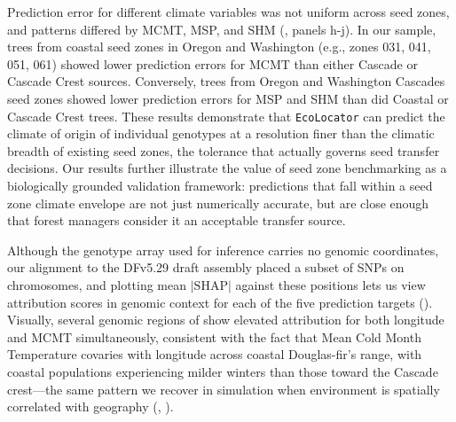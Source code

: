 \documentclass[]{article}
\newcommand{\dfir}{Douglas-fir\xspace}
\newcommand{\ecolocator}{\texttt{EcoLocator}\xspace}
\begin{document}
Prediction error for different climate variables was not uniform across seed zones,
and patterns differed by MCMT, MSP, and SHM
(, panels h-j). In our sample, trees from coastal seed 
zones in Oregon and Washington (e.g., zones 031, 041, 051, 061) showed lower prediction
errors for MCMT than either Cascade or Cascade Crest sources.
Conversely, trees from Oregon and Washington Cascades seed zones showed
lower prediction errors for MSP and SHM than did Coastal or Cascade Crest trees. 
These results demonstrate that \ecolocator
can predict the climate of origin of individual genotypes
at a resolution finer than the climatic breadth of existing seed zones,
the tolerance that actually governs seed transfer decisions.
Our results further illustrate the value of seed zone benchmarking
as a biologically grounded validation framework:
predictions that fall within a seed zone climate envelope
are not just numerically accurate,
but are close enough that forest managers
consider it an acceptable transfer source.

Although the genotype array used for inference carries no genomic coordinates,
our alignment to the DFv5.29 draft assembly placed a subset of SNPs
on chromosomes, and plotting mean $\lvert\mathrm{SHAP}\rvert$ against these positions
lets us view attribution scores in genomic context for each of the
five prediction targets ().
Visually, several genomic regions of  show elevated attribution for both longitude and
MCMT simultaneously, consistent with the fact that Mean Cold Month
Temperature covaries with longitude across coastal \dfir's range,
with coastal populations experiencing milder winters than those toward 
the Cascade crest---the same pattern we recover in simulation when 
environment is spatially correlated with geography (, ). 
\end{document}
